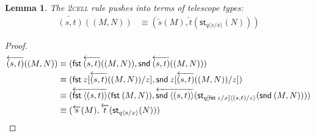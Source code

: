 \documentclass[10pt]{article}
\newtheorem{lemma}{Lemma}
\theoremstyle{definition}
\newcommand\dsd[1]{\ensuremath{\mathsf{#1}}}
\newcommand{\rewrite}[2]{\overleftarrow{#1}(#2)}
\newcommand\StI[2]{\ensuremath{\mathsf{st}_{#1}(#2)}}
\newcommand\UnSt[2]{\ensuremath{\mathsf{unst}_{#1}(#2)}}
\newcommand{\id}{\mathsf{id}}
\newcommand\ap[2]{\ensuremath{#1 \langle #2 \rangle }}
\newcommand{\app}[2]{\ensuremath{#1 \: #2}}
\newcommand{\fst}[1]{\app{\dsd{fst}}{#1}}
\newcommand{\snd}[1]{\app{\dsd{snd}}{#1}}
\begin{document}
\begin{lemma}
The \textsc{2cell} rule pushes into terms of telescope types:
\begin{align*}
\rewrite{(s, t)}{(M, N)} &\equiv (\rewrite{s}{M}, \rewrite{t}{\StI{\ap{q}{s/x}}{N}} ) 
\end{align*}
\end{lemma}
\begin{proof}
\begin{align*}
\rewrite{(s, t)}{(M, N)} 
&\equiv (\fst\rewrite{(s, t)}{(M, N)}, \snd \rewrite{(s, t)}{(M, N)} ) \\
&\equiv (\fst z [\rewrite{(s, t)}{(M, N)}/z], \snd z [\rewrite{(s, t)}{(M, N)}/z] ) \\
&\equiv (\rewrite{\ap{\fst}{(s, t)}}{\fst (M, N)}, \rewrite{\ap{\snd}{(s, t)}}{\StI{\ap{q[\fst z/x]}{(s, t)/z}}{\snd (M, N)}} ) \\
&\equiv (\rewrite{s}{M}, \rewrite{t}{\StI{\ap{q}{s/x}}{N}} )
\end{align*}


\end{proof}
\end{document}
